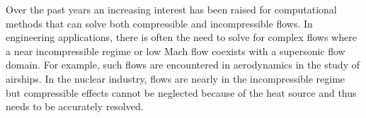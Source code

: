 \documentclass[preprint,10pt]{elsarticle}
\newcommand{\tcr}[1]{\textcolor{red}{#1}}
\begin{document}
%
%
Over the past years an increasing interest has been raised for computational methods that can solve both compressible and incompressible flows. In engineering applications, there is often the need to solve for complex flows where a near incompressible regime or low Mach flow coexists with a supersonic flow domain. For example, such flows are encountered in aerodynamics in the study of airships. In the nuclear industry, flows are nearly in the incompressible regime but compressible effects cannot be neglected because of the heat source and thus needs to be accurately resolved. \\
\end{document}
